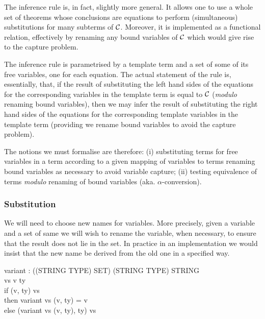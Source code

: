 \documentclass[a4paper,11pt,titlepage]{article}
\begin{document}
\begin{titlepage}
The inference rule is, in fact, slightly more
general. It allows one to use a whole set of theorems
whose conclusions are equations to perform (simultaneous)
substitutions for many subterms of $\cal C$. Moreover,
it is implemented as a functional relation, effectively by
renaming any bound variables of $\cal C$ which would
give rise to the capture problem.

The inference rule is parametrised by a template term
and a set of some of its free variables, one for each equation.
The actual statement of the rule is, essentially, that,
if the result of substituting the left hand sides
of the equations for the corresponding variables
in the template term
is equal to $\cal C$ ({\it modulo} renaming bound
variables), then we may infer the result of substituting
the right hand sides of the equations for the
corresponding template variables in the template term
(providing we rename bound variables to avoid the capture
problem).


The notions we must formalise are therefore:
(i) substituting terms for
free variables in a term according to a given mapping
of variables to terms renaming bound variables
as necessary to avoid variable capture;
(ii) testing equivalence of
terms {\it modulo} renaming of bound variables (aka.
$\alpha$-conversion).

\subsubsection{Substitution}

We will need to choose new names for variables.
More precisely,
given a variable and a set of same we will
wish to rename the variable, when necessary,
to ensure that the result
does not lie in the set.
In practice in an implementation we would insist that the new name
be derived from the old one in a specified way.

\begin{HOLConst}
\+	\PrNL{}variant\PrNN{} : ((STRING \MMM{\times} TYPE) SET) \MMM{\rightarrow} (STRING \MMM{\times} TYPE) \MMM{\rightarrow} STRING\\
\PrPH{}
\+	\MMM{\forall} vs v ty \MMM{\bullet}\\
\+		if \MMM{\lnot}(v, ty) \MMM{\in} vs\\
\+		then variant vs (v, ty) = v\\
\+		else \MMM{\lnot}(variant vs (v, ty), ty) \MMM{\in} vs\\
\end{HOLConst}



\end{titlepage}
\end{document}
